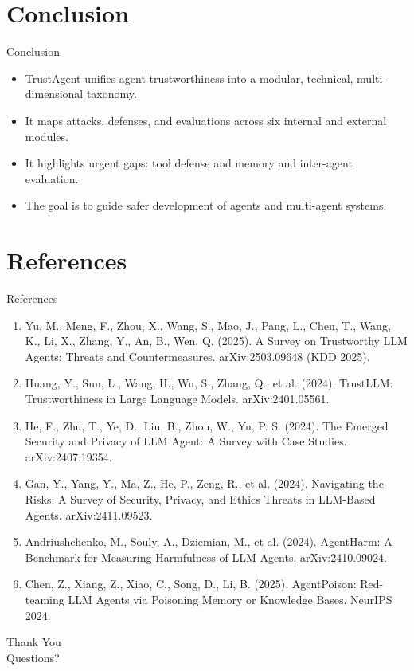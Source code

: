 \documentclass[10pt]{beamer}
\begin{document}
\section{Conclusion}
\begin{frame}{Conclusion}
\begin{itemize}
  \item TrustAgent unifies agent trustworthiness into a modular, technical, multi-dimensional taxonomy.
  \item It maps attacks, defenses, and evaluations across six internal and external modules.
  \item It highlights urgent gaps: tool defense and memory and inter-agent evaluation.
  \item The goal is to guide safer development of agents and multi-agent systems.
\end{itemize}
\end{frame}
\section{References}
\begin{frame}[allowframebreaks]{References}
  \footnotesize
  \begin{enumerate}
    \item Yu, M., Meng, F., Zhou, X., Wang, S., Mao, J., Pang, L., Chen, T., Wang, K., Li, X., Zhang, Y., An, B., Wen, Q. (2025). A Survey on Trustworthy LLM Agents: Threats and Countermeasures. arXiv:2503.09648 (KDD 2025).
    \item Huang, Y., Sun, L., Wang, H., Wu, S., Zhang, Q., et al. (2024). TrustLLM: Trustworthiness in Large Language Models. arXiv:2401.05561.
    \item He, F., Zhu, T., Ye, D., Liu, B., Zhou, W., Yu, P. S. (2024). The Emerged Security and Privacy of LLM Agent: A Survey with Case Studies. arXiv:2407.19354.
    \item Gan, Y., Yang, Y., Ma, Z., He, P., Zeng, R., et al. (2024). Navigating the Risks: A Survey of Security, Privacy, and Ethics Threats in LLM-Based Agents. arXiv:2411.09523.
    \item Andriushchenko, M., Souly, A., Dziemian, M., et al. (2024). AgentHarm: A Benchmark for Measuring Harmfulness of LLM Agents. arXiv:2410.09024.
    \item Chen, Z., Xiang, Z., Xiao, C., Song, D., Li, B. (2025). AgentPoison: Red-teaming LLM Agents via Poisoning Memory or Knowledge Bases. NeurIPS 2024.
  \end{enumerate}
\end{frame}
\begin{frame}[plain]
  \begin{center}
    {\Huge Thank You}\\[1em]
    {\large Questions?}
  \end{center}
\end{frame}
\end{document}
